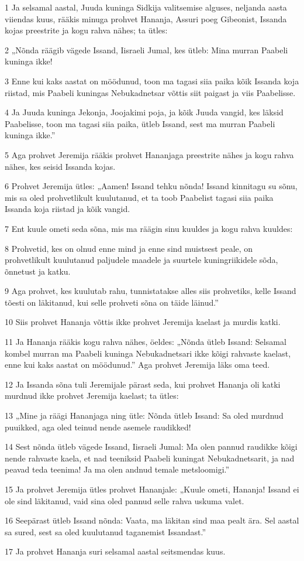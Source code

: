 \par 1 Ja selsamal aastal, Juuda kuninga Sidkija valitsemise alguses, neljanda aasta viiendas kuus, rääkis minuga prohvet Hananja, Assuri poeg Gibeonist, Issanda kojas preestrite ja kogu rahva nähes; ta ütles:
\par 2 „Nõnda räägib vägede Issand, Iisraeli Jumal, kes ütleb: Mina murran Paabeli kuninga ikke!
\par 3 Enne kui kaks aastat on möödunud, toon ma tagasi siia paika kõik Issanda koja riistad, mis Paabeli kuningas Nebukadnetsar võttis siit paigast ja viis Paabelisse.
\par 4 Ja Juuda kuninga Jekonja, Joojakimi poja, ja kõik Juuda vangid, kes läksid Paabelisse, toon ma tagasi siia paika, ütleb Issand, sest ma murran Paabeli kuninga ikke.”
\par 5 Aga prohvet Jeremija rääkis prohvet Hananjaga preestrite nähes ja kogu rahva nähes, kes seisid Issanda kojas.
\par 6 Prohvet Jeremija ütles: „Aamen! Issand tehku nõnda! Issand kinnitagu su sõnu, mis sa oled prohvetlikult kuulutanud, et ta toob Paabelist tagasi siia paika Issanda koja riistad ja kõik vangid.
\par 7 Ent kuule ometi seda sõna, mis ma räägin sinu kuuldes ja kogu rahva kuuldes:
\par 8 Prohvetid, kes on olnud enne mind ja enne sind muistsest peale, on prohvetlikult kuulutanud paljudele maadele ja suurtele kuningriikidele sõda, õnnetust ja katku.
\par 9 Aga prohvet, kes kuulutab rahu, tunnistatakse alles siis prohvetiks, kelle Issand tõesti on läkitanud, kui selle prohveti sõna on täide läinud.”
\par 10 Siis prohvet Hananja võttis ikke prohvet Jeremija kaelast ja murdis katki.
\par 11 Ja Hananja rääkis kogu rahva nähes, öeldes: „Nõnda ütleb Issand: Selsamal kombel murran ma Paabeli kuninga Nebukadnetsari ikke kõigi rahvaste kaelast, enne kui kaks aastat on möödunud.” Aga prohvet Jeremija läks oma teed.
\par 12 Ja Issanda sõna tuli Jeremijale pärast seda, kui prohvet Hananja oli katki murdnud ikke prohvet Jeremija kaelast; ta ütles:
\par 13 „Mine ja räägi Hananjaga ning ütle: Nõnda ütleb Issand: Sa oled murdnud puuikked, aga oled teinud nende asemele raudikked!
\par 14 Sest nõnda ütleb vägede Issand, Iisraeli Jumal: Ma olen pannud raudikke kõigi nende rahvaste kaela, et nad teeniksid Paabeli kuningat Nebukadnetsarit, ja nad peavad teda teenima! Ja ma olen andnud temale metsloomigi.”
\par 15 Ja prohvet Jeremija ütles prohvet Hananjale: „Kuule ometi, Hananja! Issand ei ole sind läkitanud, vaid sina oled pannud selle rahva uskuma valet.
\par 16 Seepärast ütleb Issand nõnda: Vaata, ma läkitan sind maa pealt ära. Sel aastal sa sured, sest sa oled kuulutanud taganemist Issandast.”
\par 17 Ja prohvet Hananja suri selsamal aastal seitsmendas kuus.

